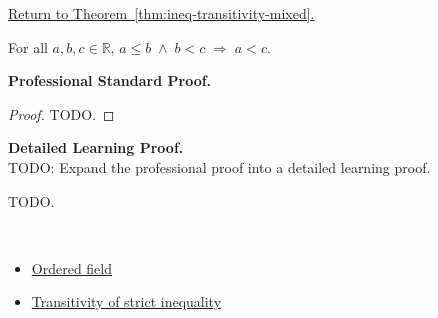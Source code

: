 \newpage
{}
\label{prf:ineq-transitivity-mixed}

\begin{remark*}[Return]
\hyperref[thm:ineq-transitivity-mixed]{Return to Theorem~\ref*{thm:ineq-transitivity-mixed}.}
\end{remark*}

\begin{theorem*}
For all $a, b, c \in \mathbb{R}$,
$a \le b \;\land\; b < c \;\Rightarrow\; a < c$.
\end{theorem*}

\textbf{Professional Standard Proof.}~\\
\begin{proof}
TODO.
\end{proof}

\textbf{Detailed Learning Proof.}~\\
TODO: Expand the professional proof into a detailed learning proof.


\begin{remark*}
TODO.
\end{remark*}

\begin{remark*}[Dependencies]~\\
\begin{itemize}
  \item \hyperref[def:ordered-field]{Ordered field}
  \item \hyperref[thm:ineq-transitivity-strict]{Transitivity of strict inequality}
\end{itemize}
\end{remark*}
